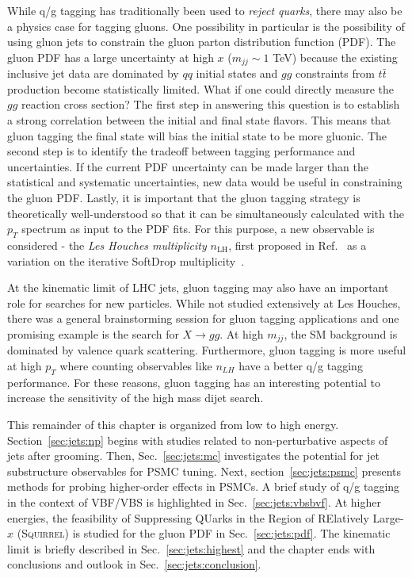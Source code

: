 \documentclass[11pt]{cernrep}
\begin{document}
While q/g tagging has traditionally been used to \textit{reject quarks}, there may also be a physics case for tagging gluons.  One possibility in particular is the possibility of using gluon jets to constrain the gluon parton distribution function (PDF).  The gluon PDF has a large uncertainty at high $x$ ($m_{jj}\sim 1$ TeV) because the existing inclusive jet data are dominated by $qq$ initial states and $gg$ constraints from $t\bar{t}$ production become statistically limited.  What if one could directly measure the $gg$ reaction cross section?  The first step in answering this question is to establish a strong correlation between the initial and final state flavors.  This means that gluon tagging the final state will bias the initial state to be more gluonic.   The second step is to identify the tradeoff between tagging performance and uncertainties.  If the current PDF uncertainty can be made larger than the statistical and systematic uncertainties, new data would be useful in constraining the gluon PDF.  Lastly, it is important that the gluon tagging strategy is theoretically well-understood so that it can be simultaneously calculated with the $p_T$ spectrum as input to the PDF fits.  For this purpose, a new observable is considered - the \textit{Les Houches multiplicity} $n_\text{LH}$, first proposed in Ref.~\cite{Marzani:2019hun} as a variation on the iterative SoftDrop multiplicity~\cite{Frye:2017yrw}.

At the kinematic limit of LHC jets, gluon tagging may also have an important role for searches for new particles.  While not studied extensively at Les Houches, there was a general brainstorming session for gluon tagging applications and one promising example is the search for $X\rightarrow gg$.  At high $m_{jj}$, the SM background is dominated by valence quark scattering.  Furthermore, gluon tagging is more useful at high $p_T$ where counting observables like $n_{LH}$ have a better q/g tagging performance.  For these reasons, gluon tagging has an interesting potential to increase the sensitivity of the high mass dijet search.

This remainder of this chapter is organized from low to high energy.  Section~\ref{sec:jets:np} begins with studies related to non-perturbative aspects of jets after grooming.  Then, Sec.~\ref{sec:jets:mc} investigates the potential for jet substructure observables for PSMC tuning.  Next, section~\ref{sec:jets:psmc} presents methods for probing higher-order effects in PSMCs.  A brief study of q/g tagging in the context of VBF/VBS is highlighted in Sec.~\ref{sec:jets:vbsbvf}.  At higher energies, the feasibility of Suppressing QUarks in the Region of RElatively Large-$x$ (\textsc{Squirrel}) is studied for the gluon PDF in Sec.~\ref{sec:jets:pdf}.  The kinematic limit is briefly described in Sec.~\ref{sec:jets:highest} and the chapter ends with conclusions and outlook in Sec.~\ref{sec:jets:conclusion}.
\end{document}
